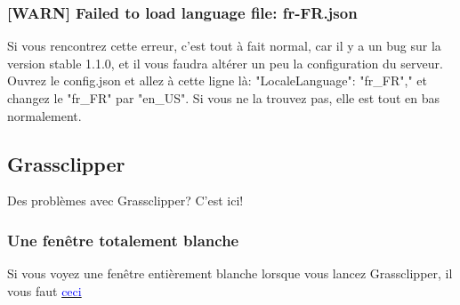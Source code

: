 \documentclass{article}
\begin{document}
\subsubsection{[WARN] Failed to load language file: fr-FR.json}
Si vous rencontrez cette erreur, c'est tout à fait normal, car il y a un bug sur la version stable 1.1.0, et il vous faudra altérer un peu la configuration du serveur.\newline
Ouvrez le config.json et allez à cette ligne là: "LocaleLanguage": "fr\_FR"," et changez le "fr\_FR" par "en\_US".\newline
Si vous ne la trouvez pas, elle est tout en bas normalement.

\subsection{Grassclipper}
Des problèmes avec Grassclipper? C'est ici!

\subsubsection{Une fenêtre totalement blanche}
Si vous voyez une fenêtre entièrement blanche lorsque vous lancez Grassclipper, il vous faut \href{https://developer.microsoft.com/en-us/microsoft-edge/webview2/#download}{\textcolor{blue}{ceci}}
\end{document}
